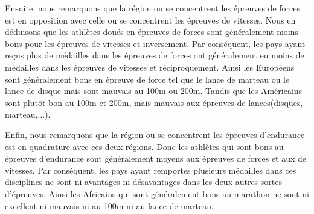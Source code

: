 \documentclass{article}
\begin{document}
Ensuite, nous remarquons que la région ou se concentrent les épreuves de forces est en opposition avec celle ou se concentrent les épreuves de vitesses. Nous en déduisons que les athlètes doués en épreuves de forces sont généralement moins bons pour les épreuves de vitesses et inversement. Par conséquent, les pays ayant reçus plus de médailles dans les épreuves de forces ont généralement eu moins de médailles dans les épreuves de vitesses et réciproquement. Ainsi les Européens sont généralement bons en épreuve de force tel que le lance de marteau ou le lance de disque mais sont mauvais au 100m ou 200m. Tandis que les Américains sont plutôt bon au 100m et 200m, mais mauvais aux épreuves de lances(disques, marteau,...).
\newline

Enfin, nous remarquons que la région ou se concentrent les épreuves d'endurance est en quadrature avec ces deux régions. Donc les athlètes qui sont bons au épreuves d'endurance sont généralement moyens aux épreuves de forces et aux de vitesses. Par conséquent, les pays ayant remportes plusieurs médailles dans ces disciplines ne sont ni avantages ni désavantages dans les deux autres sortes d'épreuves. Ainsi les Africains qui sont généralement bons au marathon ne sont ni excellent ni mauvais ni au 100m ni au lance de marteau.
\end{document}
